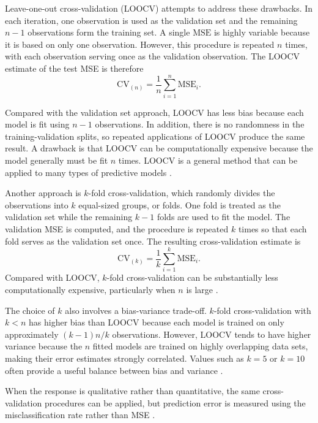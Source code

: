 \documentclass[11pt,letterpaper,reqno]{amsart}
\numberwithin{equation}{subsection}
\theoremstyle{definition}
\numberwithin{thm}{subsection}
\begin{document}
Leave-one-out cross-validation (LOOCV) attempts to address these drawbacks. In each iteration, one observation is used as the validation set and the remaining $n-1$ observations form the training set. A single $\mathrm{MSE}$ is highly variable because it is based on only one observation. However, this procedure is repeated $n$ times, with each observation serving once as the validation observation. The LOOCV estimate of the test MSE is therefore \cite[Equation 5.1, p. 204]{James:2023}
\[
\mathrm{CV}_{(n)} = \frac{1}{n}\sum_{i=1}^{n}\mathrm{MSE}_i.
\]

Compared with the validation set approach, LOOCV has less bias because each model is fit using $n-1$ observations. In addition, there is no randomness in the training-validation splits, so repeated applications of LOOCV produce the same result. A drawback is that LOOCV can be computationally expensive because the model generally must be fit $n$ times. LOOCV is a general method that can be applied to many types of predictive models \cite[Equation 5.1 and Section 5.1.2, pp. 204--206]{James:2023}.

Another approach is $k$-fold cross-validation, which randomly divides the observations into $k$ equal-sized groups, or folds. One fold is treated as the validation set while the remaining $k-1$ folds are used to fit the model. The validation MSE is computed, and the procedure is repeated $k$ times so that each fold serves as the validation set once. The resulting cross-validation estimate is \cite[Equation 5.3, p. 206]{James:2023}
\[
\mathrm{CV}_{(k)} = \frac{1}{k}\sum_{i=1}^{k}\mathrm{MSE}_i.
\]
Compared with LOOCV, $k$-fold cross-validation can be substantially less computationally expensive, particularly when $n$ is large \cite[Equation 5.3 and Section 5.1.3, pp. 206--207]{James:2023}.

The choice of $k$ also involves a bias-variance trade-off. $k$-fold cross-validation with $k<n$ has higher bias than LOOCV because each model is trained on only approximately $(k-1)n/k$ observations. However, LOOCV tends to have higher variance because the $n$ fitted models are trained on highly overlapping data sets, making their error estimates strongly correlated. Values such as $k=5$ or $k=10$ often provide a useful balance between bias and variance \cite[Section 5.1.4, pp. 208--209]{James:2023}.

When the response is qualitative rather than quantitative, the same cross-validation procedures can be applied, but prediction error is measured using the misclassification rate rather than MSE \cite[Section 5.1.5, p. 209]{James:2023}.
\end{document}
